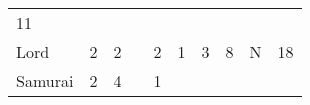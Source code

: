 \documentclass[12pt]{article}
\newcommand{\indexClass}[1]{\index{#1}}
\newcommand{\class}[1]{#1\indexClass{#1}}
\begin{document}
\begin{longtable}[]{@{}llllllllll@{}}
\begin{minipage}[t]{0.08\columnwidth}\raggedright\strut
11
\strut\end{minipage}\tabularnewline
\begin{minipage}[t]{0.13\columnwidth}\raggedright\strut
\class{Lord}
\strut\end{minipage} &
\begin{minipage}[t]{0.06\columnwidth}\raggedright\strut
2
\strut\end{minipage} &
\begin{minipage}[t]{0.06\columnwidth}\raggedright\strut
2
\strut\end{minipage} &
\begin{minipage}[t]{0.06\columnwidth}\raggedright\strut
\strut\end{minipage} &
\begin{minipage}[t]{0.06\columnwidth}\raggedright\strut
2
\strut\end{minipage} &
\begin{minipage}[t]{0.06\columnwidth}\raggedright\strut
1
\strut\end{minipage} &
\begin{minipage}[t]{0.06\columnwidth}\raggedright\strut
3
\strut\end{minipage} &
\begin{minipage}[t]{0.06\columnwidth}\raggedright\strut
8
\strut\end{minipage} &
\begin{minipage}[t]{0.07\columnwidth}\raggedright\strut
N
\strut\end{minipage} &
\begin{minipage}[t]{0.08\columnwidth}\raggedright\strut
18
\strut\end{minipage}\tabularnewline
\begin{minipage}[t]{0.13\columnwidth}\raggedright\strut
\class{Samurai}
\strut\end{minipage} &
\begin{minipage}[t]{0.06\columnwidth}\raggedright\strut
2
\strut\end{minipage} &
\begin{minipage}[t]{0.06\columnwidth}\raggedright\strut
4
\strut\end{minipage} &
\begin{minipage}[t]{0.06\columnwidth}\raggedright\strut
\strut\end{minipage} &
\begin{minipage}[t]{0.06\columnwidth}\raggedright\strut
1
\strut\end{minipage} &

\end{longtable}
\end{document}
